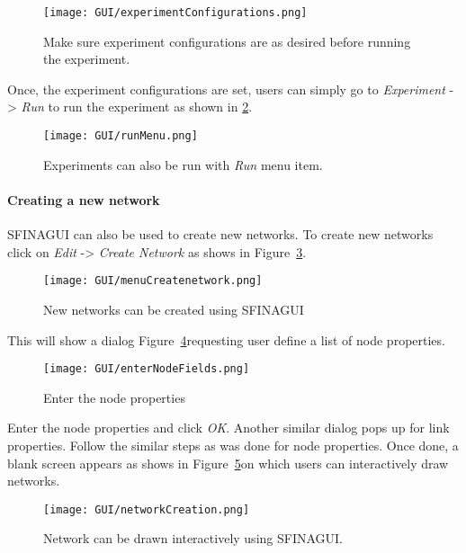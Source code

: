 \documentclass[11pt,fleqn]{book} %
\begin{document}
\begin{figure}[H]
	\centering
	\texttt{[image: GUI/experimentConfigurations.png]}
	\caption{Make sure experiment configurations are as desired before running the experiment.}\label{fig:experimentconfiguration}	
\end{figure}

Once, the experiment configurations are set, users can simply go to \textit{Experiment} -> \textit{Run} to run the experiment as shown in \ref{fig:runmenu}.

\begin{figure}[H]
	\centering
	\texttt{[image: GUI/runMenu.png]}
	\caption{Experiments can also be run with \textit{Run} menu item.}\label{fig:runmenu}
\end{figure}

\paragraph{Creating a new network}
SFINAGUI can also be used to create new networks. To create new networks click on \textit{Edit} -> \textit{Create Network} as shows in Figure~\ref{fig:createnetwork}.
\begin{figure}[H]
	\centering
		\texttt{[image: GUI/menuCreatenetwork.png]}
		\caption{New networks can be created using SFINAGUI}\label{fig:createnetwork}
\end{figure}

This will show a dialog Figure~\ref{fig:enternodefields}requesting user define a list of node properties. 

\begin{figure}[H]
	\centering
	\texttt{[image: GUI/enterNodeFields.png]}
	\caption{Enter the node properties}\label{fig:enternodefields}
\end{figure}

Enter the node properties and click \textit{OK}. Another similar dialog pops up for link properties. Follow the similar steps as was done for node properties. Once done, a blank screen appears as shows in Figure~\ref{fig:networkCreation}on which users can interactively draw networks.

\begin{figure}[H]
	\centering
	\texttt{[image: GUI/networkCreation.png]}
	\caption{Network can be drawn interactively using SFINAGUI.}\label{fig:networkCreation}
\end{figure}
\end{document}
